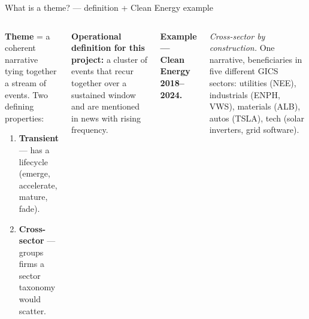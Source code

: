 \documentclass[10pt,aspectratio=169]{beamer}
\begin{document}
\begin{frame}{What is a theme? --- definition + Clean Energy example}
  \footnotesize

  \begin{columns}[T,onlytextwidth]
      \begin{tcolorbox}[colback=corpblue!8, colframe=corpblue,
                        boxrule=0.4pt, arc=2pt,
                        left=6pt, right=6pt, top=4pt, bottom=4pt]
        \footnotesize
        \textbf{Theme} = a coherent narrative tying together a stream of events.
        Two defining properties:
        \begin{enumerate}\setlength\itemsep{0.04cm}
          \item \textbf{Transient} --- has a lifecycle (emerge,
                accelerate, mature, fade).
          \item \textbf{Cross-sector} --- groups firms a sector
                taxonomy would scatter.
        \end{enumerate}
      \end{tcolorbox}

      \vspace{0.15cm}
      \textbf{Operational definition for this project:}\;
      a cluster of events that recur together over a sustained window
      and are mentioned in news with rising frequency.

      \textbf{Example --- Clean Energy 2018--2024.}

      \vspace{0.10cm}
      \emph{Cross-sector by construction.}
      One narrative, beneficiaries in five different GICS sectors:
      utilities (NEE), industrials (ENPH, VWS), materials (ALB),
      autos (TSLA), tech (solar inverters, grid software).


\end{columns}
\end{frame}
\end{document}
